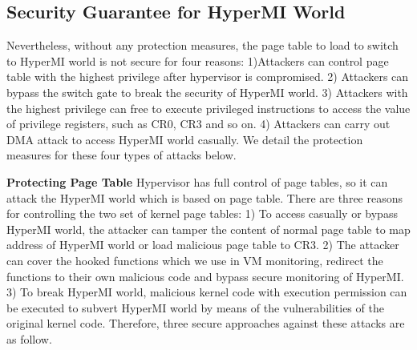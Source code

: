 \documentclass[conference]{IEEEtran}
\begin{document}
\subsection{Security Guarantee for HyperMI World}\label {SG}
Nevertheless, without any protection measures, the page table to load to switch to HyperMI world is not secure for four reasons: 1)Attackers can control page table with the highest privilege after hypervisor is compromised. 2) Attackers can bypass the switch gate to break the security of HyperMI world. 3) Attackers with the highest privilege can free to execute privileged instructions to access the value of privilege registers, such as CR0, CR3 and so on. 4) Attackers can carry out DMA attack to access HyperMI world casually.
We detail the protection measures for these four types of attacks below.


\textbf{Protecting Page Table}
Hypervisor has full control of page tables, so it can attack the HyperMI world which is based on page table.
There are three reasons for controlling the two set of kernel page tables: 1) To access casually or bypass HyperMI world, the attacker can tamper the content of normal page table to map address of HyperMI world or load malicious page table to CR3.
2) The attacker can cover the hooked functions which we use in VM monitoring, redirect the functions to their own malicious code and bypass secure monitoring of HyperMI. 3) To break HyperMI world, malicious kernel code with execution permission can be executed to subvert HyperMI world by means of the vulnerabilities of the original kernel code. 
Therefore, three secure approaches against these attacks are as follow.
\end{document}
